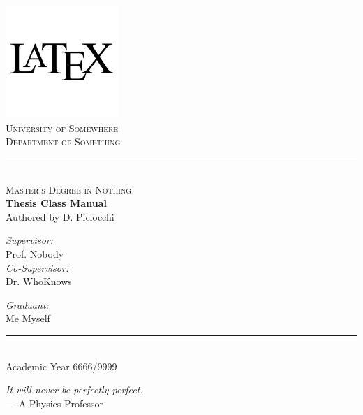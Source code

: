 \documentclass[12pt,a4papertwoside,openright,cleardoublepage=empty]{article}
\newcommand\blankpage{%
     \null
     \thispagestyle{empty}%
     \newpage}
\begin{document}
    \pagestyle{empty}
    \centering
    \includegraphics[width=0.32\textwidth]{latex.png}\\
    \vspace{0.5cm}
    {\scshape\Large University of Somewhere \\}
    \vspace{0.1cm}
    \vspace{0.1cm}
    {\scshape\large Department of Something\\}
    \rule{\linewidth}{0.9pt}\\
    \vspace{0.1cm}
    {\scshape\large Master's Degree in Nothing\\}
    \vfill
    {\Huge\bfseries Thesis Class Manual \\}
    \vspace{0.1cm}
    {\Large Authored by D. Piciocchi \\}
    \vfill
    
    \begin{minipage}[t]{6cm}
        \flushleft
        {\Large \textit{Supervisor:}} \\
        \vspace{0.1cm}
        {\Large Prof. Nobody}\\
        \vspace{0.3cm}
        {\Large \textit{Co-Supervisor:}} \\
        \vspace{0.1cm}
        {\Large Dr. WhoKnows}\\
    \end{minipage}
    \hfill
    \begin{minipage}[t]{5cm}
        \flushright
        {\Large \textit{Graduant:}} \\
        \vspace{0.1cm}
        {\Large Me Myself} \\
    \end{minipage}
    
    \vspace{1.1cm}
    \rule{\linewidth}{0.8pt}\\
    \vspace{0.4cm}
    \centering
    {\large Academic Year 6666/9999}

    \afterpage{\blankpage}
    \newpage

    \vspace*{4cm}

    \centering
    \emph{It will never be perfectly perfect.} \\
    \medskip
    --- A Physics Professor   
\end{document}
